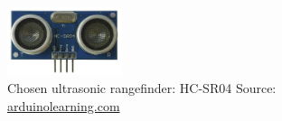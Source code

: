 
\begin{figure}[htbp]
	\centering
	\includegraphics[width=0.3\textwidth]{./figures/hc-sr04.jpg}
	\caption{Chosen ultrasonic rangefinder: HC-SR04 {\footnotesize Source: \url{arduinolearning.com}}}
	\label{fig:hc-sr04}
\end{figure}
